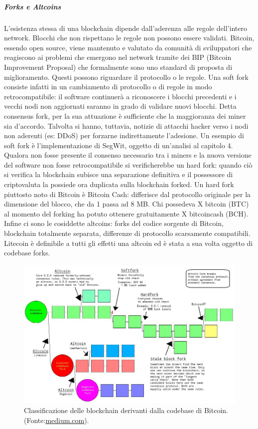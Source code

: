 \subparagraph{Forks e Altcoins}

L’esistenza stessa di una blockchain dipende dall’aderenza alle regole dell’intero network. Blocchi che non rispettano le regole non possono essere validati.
Bitcoin, essendo open source, viene mantenuto e valutato da comunità di sviluppatori che reagiscono ai problemi che emergono nel network tramite dei BIP (Bitcoin Improvement Proposal) che formalmente sono uno standard di proposta di miglioramento. Questi possono riguardare il protocollo o le regole. Una soft fork consiste infatti in un cambiamento di protocollo o di regole in modo retrocompatibile: il software continuerà a riconoscere i blocchi precedenti e i vecchi nodi non aggiornati saranno in grado di validare nuovi blocchi. Detta consensus fork, per la sua attuazione è sufficiente che la maggioranza dei miner sia d’accordo. Talvolta si hanno, tuttavia, notizie di attacchi hacker verso i nodi non aderenti (es: DDoS) per forzarne indirettamente l’adesione. Un esempio di soft fork è l’implementazione di SegWit, oggetto di un’analisi al capitolo 4.
Qualora non fosse presente il consenso necessario tra i miners e la nuova versione del software non fosse retrocompatibile si verificherebbe un hard fork: quando ciò si verifica la blockchain subisce una separazione definitiva e il possessore di criptovaluta la possiede ora duplicata sulla blockchain forked.
Un hard fork piuttosto noto di Bitcoin è Bitcoin Cash: differisce dal protocollo originale per la dimensione del blocco, che da 1 passa ad 8 MB. Chi possedeva X bitcoin (BTC) al momento del forking ha potuto ottenere gratuitamente X bitcoincash (BCH).
Infine ci sono le cosiddette altcoins: forks del codice sorgente di Bitcoin, blockchain totalmente separata, differenze di protocollo scarsamente compatibili. Litecoin è definibile a tutti gli effetti una altcoin ed è stata a sua volta oggetto di codebase forks.


\begin{figure}
	\centering
	\includegraphics[width=1.0\linewidth]{images/altcoinsoftforksetc}
	\caption{Classificazione delle blockchain derivanti dalla codebase di Bitcoin. (Fonte:\url{medium.com}).}
	\label{fig:altcoinsoftforksetc}
\end{figure}





